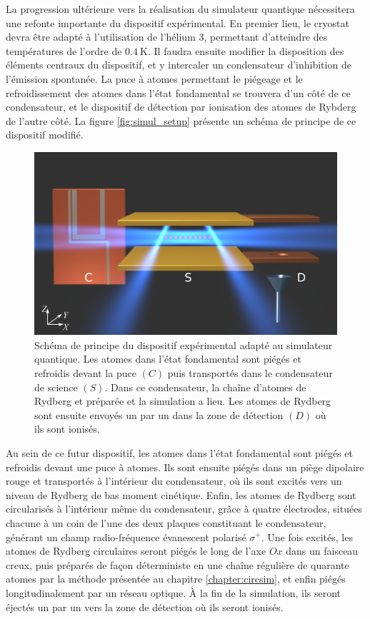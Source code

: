 \bigskip
La progression ultérieure vers la réalisation du simulateur quantique nécessitera une refonte importante du dispositif expérimental.
En premier lieu, le cryostat devra être adapté à l'utilisation de l'hélium $3$, permettant d'atteindre des températures de l'ordre de $\SI{0.4}{\K}$.
Il faudra ensuite modifier la disposition des éléments centraux du dispositif, et y intercaler un condensateur d'inhibition de l'émission spontanée.
La puce à atomes permettant le piégeage et le refroidissement des atomes dans l'état fondamental se trouvera d'un côté de ce condensateur, et le dispositif de détection par ionisation des atomes de Rybderg de l'autre côté.
La figure \eqref{fig:simul_setup} présente un schéma de principe de ce dispositif modifié.
%
\begin{figure}[t]
\centering
\includegraphics[width=0.6\linewidth]{figures/compscheme}
\caption[Schéma de principe du dispositif expérimental adapté au simulateur quantique]{
Schéma de principe du dispositif expérimental adapté au simulateur quantique.
Les atomes dans l'état fondamental sont piégés et refroidis devant la puce $(C)$ puis transportés dans le condensateur de science $(S)$.
Dans ce condensateur, la chaîne d'atomes de Rydberg et préparée et la simulation a lieu.
Les atomes de Rydberg sont ensuite envoyés un par un dans la zone de détection $(D)$ où ils sont ionisés.
}
\label{fig:simul_setup}
\end{figure}
%

Au sein de ce futur dispositif, les atomes dans l'état fondamental sont piégés et refroidis devant une puce à atomes.
Ils sont ensuite piégés dans un piège dipolaire rouge et transportés à l'intérieur du condensateur, où ils sont excités vers un niveau de Rydberg de bas moment cinétique.
Enfin, les atomes de Rydberg sont \og circularisés \fg{} à l'intérieur même du condensateur, grâce à quatre électrodes, situées chacune à un coin de l'une des deux plaques constituant le condensateur, générant un champ radio-fréquence évanescent polarisé $\sigma^+$.
Une fois excités, les atomes de Rydberg circulaires seront piégés le long de l'axe $Ox$ dans un faisceau creux, puis préparés de façon déterministe en une chaîne régulière de quarante atomes par la méthode présentée au chapitre \ref{chapter:circsim}, et enfin piégés longitudinalement par un réseau optique.
\`A la fin de la simulation, ils seront éjectés un par un vers la zone de détection où ils seront ionisés.

